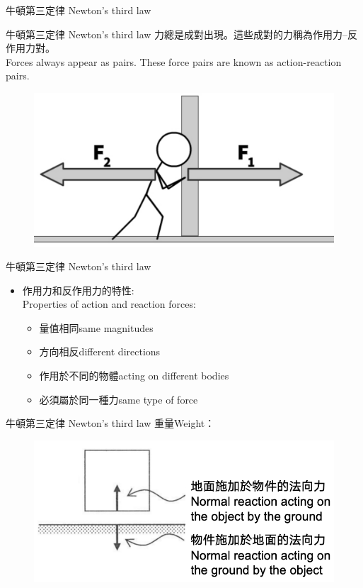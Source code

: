 \documentclass[beamer=true]{standalone}
\begin{document}
\begin{frame}{牛頓第三定律 Newton's third law}
    \begin{exampleblock}
        {牛頓第三定律 Newton's third law}
        力總是成對出現。這些成對的力稱為作用力–反作用力對。 \\Forces always appear as pairs. These force pairs are known as action-reaction pairs.
    \end{exampleblock}\bigskip
    \begin{figure}[h!]
        \centering
        \includegraphics[width=.5\textwidth]{assets/350b642d.png}
    \end{figure}
\end{frame}
\begin{frame}{牛頓第三定律 Newton's third law}
    \begin{itemize}
        \item 作用力和反作用力的特性:\\Properties of action and reaction forces:
              \begin{itemize}
                  \item 量值相同same magnitudes
                  \item 方向相反different directions
                  \item 作用於不同的物體acting on different bodies
                  \item 必須屬於同一種力same type of force
              \end{itemize}
    \end{itemize}
\end{frame}
\begin{frame}{牛頓第三定律 Newton's third law}
    重量Weight：
    \begin{figure}[h!]
        \centering
        \includegraphics[width=.8\textwidth]{assets/4949a09b.png}
    \end{figure}
\end{frame}
\end{document}
